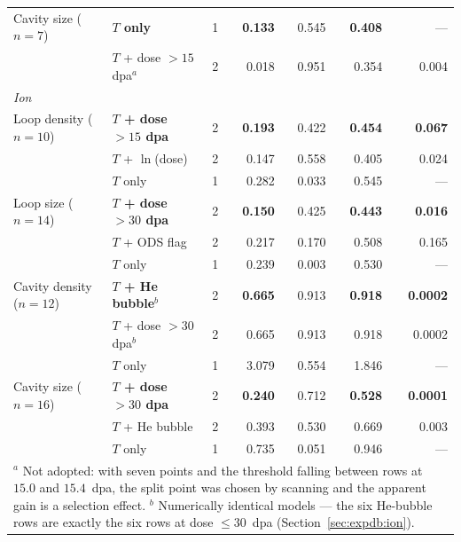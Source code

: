 \begin{table}[htbp]
\begin{tabular}{llrrrrr}
Cavity size ($n=7$)    & \textbf{$T$ only}          & 1 & \textbf{0.133} & 0.545 & \textbf{0.408} & --- \\
                       & $T$ + dose $>15$ dpa$^{a}$ & 2 & 0.018 & 0.951 & 0.354 & 0.004 \\
\midrule
\multicolumn{7}{l}{\emph{Ion}}\\
Loop density ($n=10$)  & \textbf{$T$ + dose $>15$ dpa} & 2 & \textbf{0.193} & 0.422 & \textbf{0.454} & \textbf{0.067} \\
                       & $T$ + $\ln$(dose)          & 2 & 0.147 & 0.558 & 0.405 & 0.024 \\
                       & $T$ only                   & 1 & 0.282 & 0.033 & 0.545 & --- \\[2pt]
Loop size ($n=14$)     & \textbf{$T$ + dose $>30$ dpa} & 2 & \textbf{0.150} & 0.425 & \textbf{0.443} & \textbf{0.016} \\
                       & $T$ + ODS flag             & 2 & 0.217 & 0.170 & 0.508 & 0.165 \\
                       & $T$ only                   & 1 & 0.239 & 0.003 & 0.530 & --- \\[2pt]
Cavity density ($n=12$)& \textbf{$T$ + He bubble}$^{b}$ & 2 & \textbf{0.665} & 0.913 & \textbf{0.918} & \textbf{0.0002} \\
                       & $T$ + dose $>30$ dpa$^{b}$ & 2 & 0.665 & 0.913 & 0.918 & 0.0002 \\
                       & $T$ only                   & 1 & 3.079 & 0.554 & 1.846 & --- \\[2pt]
Cavity size ($n=16$)   & \textbf{$T$ + dose $>30$ dpa} & 2 & \textbf{0.240} & 0.712 & \textbf{0.528} & \textbf{0.0001} \\
                       & $T$ + He bubble            & 2 & 0.393 & 0.530 & 0.669 & 0.003 \\
                       & $T$ only                   & 1 & 0.735 & 0.051 & 0.946 & --- \\
\bottomrule
\multicolumn{7}{p{0.93\linewidth}}{\footnotesize
$^{a}$ Not adopted: with seven points and the threshold falling between rows at
$15.0$ and $15.4$~dpa, the split point was chosen by scanning and the apparent
gain is a selection effect.\quad
$^{b}$ Numerically identical models --- the six He-bubble rows are exactly the
six rows at dose $\leq 30$~dpa (Section~\ref{sec:expdb:ion}).}
\end{tabular}
\end{table}


